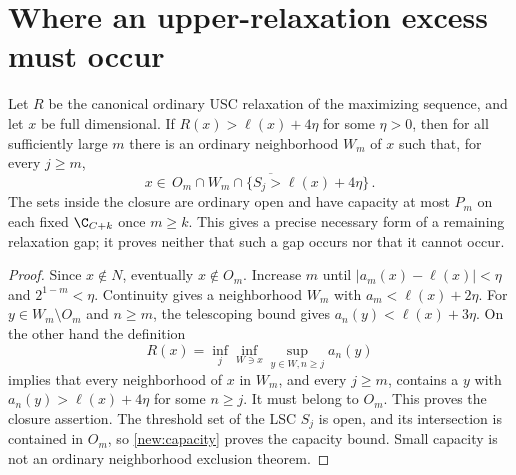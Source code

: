 \section{Where an upper-relaxation excess must occur}
\begin{proposition}\label{new:spikes}
Let $R$ be the canonical ordinary USC relaxation of the maximizing
sequence, and let $x$ be full dimensional. If
$R(x)>\ell(x)+4\eta$ for some $\eta>0$, then for all sufficiently
large $m$ there is an ordinary neighborhood $W_m$ of $x$ such that,
for every $j\ge m$,
\[
 x\in\overline{\,O_m\cap W_m\cap
                  \{S_j>\ell(x)+4\eta\}\,}.
\]
The sets inside the closure are ordinary open and have capacity at
most $P_m$ on each fixed $\C_{C+k}$ once $m\ge k$.
This gives a precise necessary form of a remaining relaxation gap;
it proves neither that such a gap occurs nor that it cannot occur.
\end{proposition}
\begin{proof}
Since $x\notin N$, eventually $x\notin O_m$. Increase $m$ until
$|a_m(x)-\ell(x)|<\eta$ and $2^{1-m}<\eta$.
Continuity gives a neighborhood $W_m$ with
$a_m<\ell(x)+2\eta$. For $y\in W_m\setminus O_m$ and $n\ge m$,
the telescoping bound gives $a_n(y)<\ell(x)+3\eta$.
On the other hand the definition
\[
 R(x)=\inf_j\inf_{W\ni x}\sup_{y\in W,n\ge j}a_n(y)
\]
implies that every neighborhood of $x$ in $W_m$, and every $j\ge m$,
contains a $y$ with $a_n(y)>\ell(x)+4\eta$ for some $n\ge j$.
It must belong to $O_m$. This proves the closure assertion.
The threshold set of the LSC $S_j$ is open, and its intersection is
contained in $O_m$, so \eqref{new:capacity} proves the capacity bound.
Small capacity is not an ordinary neighborhood exclusion theorem.
\end{proof}

